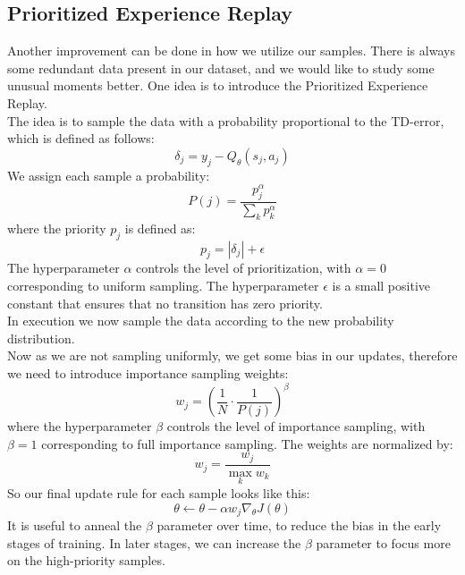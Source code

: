 \documentclass[a4paper,12pt]{article}
\begin{document}
\subsection{Prioritized Experience Replay}
Another improvement can be done in how we utilize our samples. There is always some redundant data present in our dataset, and we would like to study some unusual moments better. One idea is to introduce the Prioritized Experience Replay.
\\
The idea is to sample the data with a probability proportional to the TD-error, which is defined as follows:
\[
\delta_j = y_j - Q_\theta(s_j, a_j)
\]
We assign each sample a probability:
\[
P(j) = \frac{p_j^\alpha}{\sum_k p_k^\alpha}
\]
where the priority $p_j$ is defined as:
\[
p_j = |\delta_j| + \epsilon
\]
The hyperparameter $\alpha$ controls the level of prioritization, with $\alpha = 0$ corresponding to uniform sampling. The hyperparameter $\epsilon$ is a small positive constant that ensures that no transition has zero priority.
\\ In execution we now sample the data according to the new probability distribution.
\\ Now as we are not sampling uniformly, we get some bias in our updates, therefore we need to introduce importance sampling weights:
\[
w_j = \left( \frac{1}{N} \cdot \frac{1}{P(j)} \right)^\beta
\]
where the hyperparameter $\beta$ controls the level of importance sampling, with $\beta = 1$ corresponding to full importance sampling. The weights are normalized by:
\[
w_j = \frac{w_j}{\max_k w_k}
\]
So our final update rule for each sample looks like this:
\[
\theta \leftarrow \theta - \alpha w_j \nabla_\theta J(\theta)
\]
It is useful to anneal the $\beta$ parameter over time, to reduce the bias in the early stages of training. In later stages, we can increase the $\beta$ parameter to focus more on the high-priority samples.
\end{document}
